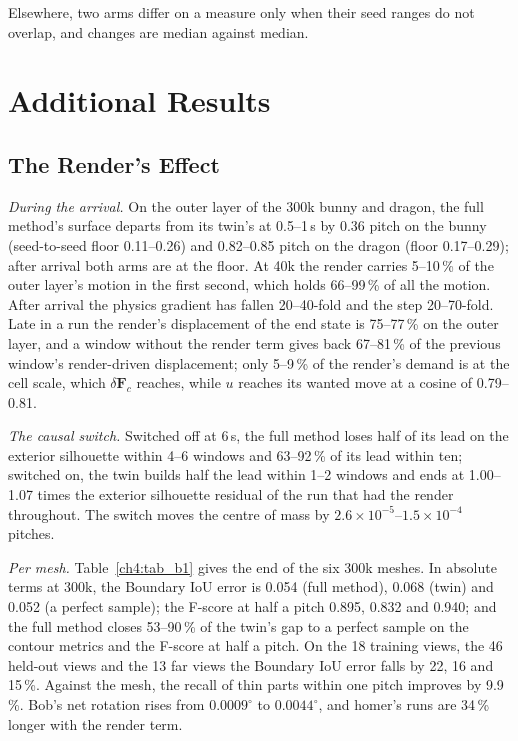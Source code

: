 Elsewhere, two arms differ on a measure only when their seed ranges do not overlap, and changes are median against median.

\section{Additional Results}
\label{app:ch4_results}

\subsection{The Render's Effect}
\textit{During the arrival.} On the outer layer of the 300k bunny and dragon, the full method's surface departs from its
twin's at 0.5--1\,s by 0.36 pitch on the bunny (seed-to-seed floor 0.11--0.26) and 0.82--0.85 pitch on the dragon (floor
0.17--0.29); after arrival both arms are at the floor. At 40k the render carries 5--10\,\% of the outer layer's motion in the
first second, which holds 66--99\,\% of all the motion. After arrival the physics gradient has fallen 20--40-fold and the step
20--70-fold. Late in a run the render's displacement of the end state is 75--77\,\% on the outer layer, and a window without
the render term gives back 67--81\,\% of the previous window's render-driven displacement; only 5--9\,\% of the render's demand
is at the cell scale, which $\delta\mathbf{F}_c$ reaches, while $u$ reaches its wanted move at a cosine of 0.79--0.81.

\textit{The causal switch.} Switched off at 6\,s, the full method loses half of its lead on the exterior silhouette within 4--6
windows and 63--92\,\% of its lead within ten; switched on, the twin builds half the lead within 1--2 windows and ends at
1.00--1.07 times the exterior silhouette residual of the run that had the render throughout. The switch moves the centre of
mass by $2.6\times10^{-5}$--$1.5\times10^{-4}$ pitches.

\textit{Per mesh.} Table~\ref{ch4:tab_b1} gives the end of the six 300k meshes. In absolute terms at 300k, the Boundary IoU
error is 0.054 (full method), 0.068 (twin) and 0.052 (a perfect sample); the F-score at half a pitch 0.895, 0.832 and 0.940; and
the full method closes 53--90\,\% of the twin's gap to a perfect sample on the contour metrics and the F-score at half a pitch.
On the 18 training views, the 46 held-out views and the 13 far views the Boundary IoU error falls by 22, 16 and 15\,\%. Against
the mesh, the recall of thin parts within one pitch improves by 9.9\,\%. Bob's net rotation rises from $0.0009^\circ$ to
$0.0044^\circ$, and homer's runs are 34\,\% longer with the render term.

